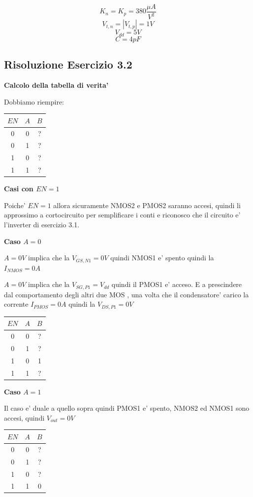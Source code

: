 \documentclass[\main/main.tex]{subfiles}
\begin{document}
\[K_n = K_p = 380\frac{\mu A}{V^2}\]
\[V_{t,n} = |V_{t,p}| = 1V\]
\[V_{dd} = 5V\]
\[C = 4pF\]

\clearpage
\subsection{Risoluzione Esercizio 3.2}
\textbf{Calcolo della tabella di verita'}

Dobbiamo riempire:
\begin{center}
	\begin{tabular}{ c  c | c}
		$EN$ & $A$ & $B$ \\
		\hline
		0    & 0   & ?   \\
		0    & 1   & ?   \\
		1    & 0   & ?   \\
		1    & 1   & ?   \\
	\end{tabular}
\end{center}

\textbf{Casi con $EN = 1$}

Poiche' $EN = 1$ allora sicuramente NMOS2 e PMOS2 saranno accesi, quindi li approssimo a cortocircuito per semplificare i conti e riconosco che il circuito e' l'inverter di esercizio 3.1.

\textbf{Caso $A = 0$}

$A = 0V$ implica che la $V_{GS,N1} = 0V$ quindi NMOS1 e' spento quindi la $I_{NMOS}  = 0A$

$A = 0V$ implica che la $V_{SG,P1} = V_{dd}$ quindi il PMOS1 e' acceso.
E a prescindere dal comportamento degli altri due MOS , una volta che il condensatore' carico la corrente $I_{PMOS} = 0A$ quindi la $V_{DS,P1} = 0V$
\begin{center}
	\begin{tabular}{ c  c | c}
		$EN$ & $A$ & $B$ \\
		\hline
		0    & 0   & ?   \\
		0    & 1   & ?   \\
		1    & 0   & 1   \\
		1    & 1   & ?   \\
	\end{tabular}
\end{center}

\textbf{Caso  $A = 1$}

Il caso e' duale a quello sopra quindi PMOS1 e' spento, NMOS2 ed NMOS1 sono accesi, quindi $V_{out} = 0V$

\begin{center}
	\begin{tabular}{ c  c | c}
		$EN$ & $A$ & $B$ \\
		\hline
		0    & 0   & ?   \\
		0    & 1   & ?   \\
		1    & 0   & ?   \\
		1    & 1   & 0   \\
	\end{tabular}
\end{center}
\end{document}

